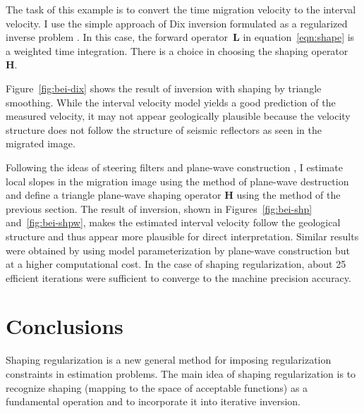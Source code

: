 The task of this example is to convert the time migration velocity to
the interval velocity. I use the simple approach of Dix inversion
\cite[]{GEO20-01-00680086} formulated as a regularized inverse problem
\cite[]{alejandro}. In this case, the forward operator~$\mathbf{L}$ in
equation~\ref{eqn:shape} is a weighted time
integration. There is a choice in choosing the shaping
operator~$\mathbf{H}$.

Figure~\ref{fig:bei-dix} shows the result of inversion with shaping by
triangle smoothing. While the interval velocity model yields a good
prediction of the measured velocity, it may not appear geologically
plausible because the velocity structure does not follow the structure
of seismic reflectors as seen in the migrated image.

Following the ideas of steering filters \cite[]{SEG-1998-1851,clapp}
and plane-wave construction \cite[]{pwc}, I estimate local slopes in
the migration image using the method of plane-wave destruction
\cite[]{GEO67-06-19461960} and define a triangle plane-wave shaping
operator $\mathbf{H}$ using the method of the previous
section. The result of inversion, shown in Figures~\ref{fig:bei-shp}
and~\ref{fig:bei-shpw}, makes the estimated interval velocity follow
the geological structure and thus appear more plausible for
direct interpretation. Similar results were obtained by \cite{pwc}
using model parameterization by plane-wave construction but at a
higher computational cost. In the case of shaping regularization,
about 25 efficient iterations were sufficient to converge to the
machine precision accuracy.




\section{Conclusions}
Shaping regularization is a new general method for imposing
regularization constraints in estimation problems. The main idea of
shaping regularization is to recognize shaping (mapping to the space
of acceptable functions) as a fundamental operation and to incorporate
it into iterative inversion.
\begin{comment}
There is a
resemblance between this idea and the method of POCS (projection onto
convex sets) developed by \cite{pocs} and extended to geophysical
applications by \cite{menke} and \cite{GEO58-07-09410948}. Unlike
POCS, shaping regularization embeds a linear shaping operator inside
an iterative conjugate gradient algorithm, which leads to an optimally
fast iterative convergence.
\end{comment}

